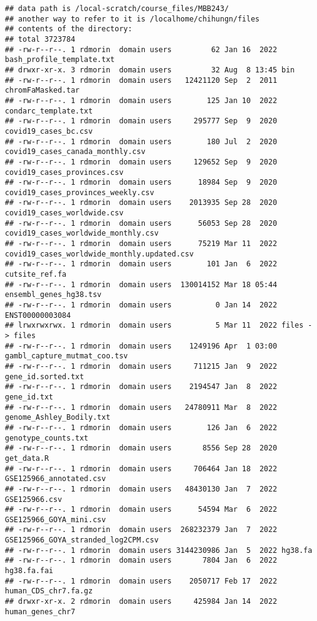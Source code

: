 \documentclass[
]{article}
\begin{document}
\begin{verbatim}
## data path is /local-scratch/course_files/MBB243/
## another way to refer to it is /localhome/chihungn/files
## contents of the directory:
## total 3723784
## -rw-r--r--. 1 rdmorin  domain users         62 Jan 16  2022 bash_profile_template.txt
## drwxr-xr-x. 3 rdmorin  domain users         32 Aug  8 13:45 bin
## -rw-r--r--. 1 rdmorin  domain users   12421120 Sep  2  2011 chromFaMasked.tar
## -rw-r--r--. 1 rdmorin  domain users        125 Jan 10  2022 condarc_template.txt
## -rw-r--r--. 1 rdmorin  domain users     295777 Sep  9  2020 covid19_cases_bc.csv
## -rw-r--r--. 1 rdmorin  domain users        180 Jul  2  2020 covid19_cases_canada_monthly.csv
## -rw-r--r--. 1 rdmorin  domain users     129652 Sep  9  2020 covid19_cases_provinces.csv
## -rw-r--r--. 1 rdmorin  domain users      18984 Sep  9  2020 covid19_cases_provinces_weekly.csv
## -rw-r--r--. 1 rdmorin  domain users    2013935 Sep 28  2020 covid19_cases_worldwide.csv
## -rw-r--r--. 1 rdmorin  domain users      56053 Sep 28  2020 covid19_cases_worldwide_monthly.csv
## -rw-r--r--. 1 rdmorin  domain users      75219 Mar 11  2022 covid19_cases_worldwide_monthly.updated.csv
## -rw-r--r--. 1 rdmorin  domain users        101 Jan  6  2022 cutsite_ref.fa
## -rw-r--r--. 1 rdmorin  domain users  130014152 Mar 18 05:44 ensembl_genes_hg38.tsv
## -rw-r--r--. 1 rdmorin  domain users          0 Jan 14  2022 ENST00000003084
## lrwxrwxrwx. 1 rdmorin  domain users          5 Mar 11  2022 files -> files
## -rw-r--r--. 1 rdmorin  domain users    1249196 Apr  1 03:00 gambl_capture_mutmat_coo.tsv
## -rw-r--r--. 1 rdmorin  domain users     711215 Jan  9  2022 gene_id.sorted.txt
## -rw-r--r--. 1 rdmorin  domain users    2194547 Jan  8  2022 gene_id.txt
## -rw-r--r--. 1 rdmorin  domain users   24780911 Mar  8  2022 genome_Ashley_Bodily.txt
## -rw-r--r--. 1 rdmorin  domain users        126 Jan  6  2022 genotype_counts.txt
## -rw-r--r--. 1 rdmorin  domain users       8556 Sep 28  2020 get_data.R
## -rw-r--r--. 1 rdmorin  domain users     706464 Jan 18  2022 GSE125966_annotated.csv
## -rw-r--r--. 1 rdmorin  domain users   48430130 Jan  7  2022 GSE125966.csv
## -rw-r--r--. 1 rdmorin  domain users      54594 Mar  6  2022 GSE125966_GOYA_mini.csv
## -rw-r--r--. 1 rdmorin  domain users  268232379 Jan  7  2022 GSE125966_GOYA_stranded_log2CPM.csv
## -rw-r--r--. 1 rdmorin  domain users 3144230986 Jan  5  2022 hg38.fa
## -rw-r--r--. 1 rdmorin  domain users       7804 Jan  6  2022 hg38.fa.fai
## -rw-r--r--. 1 rdmorin  domain users    2050717 Feb 17  2022 human_CDS_chr7.fa.gz
## drwxr-xr-x. 2 rdmorin  domain users     425984 Jan 14  2022 human_genes_chr7

\end{verbatim}
\end{document}
